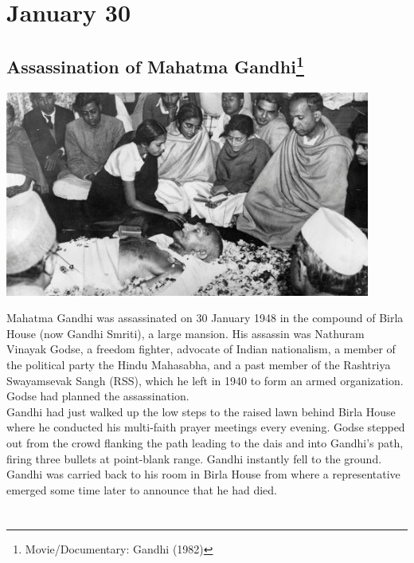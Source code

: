 \documentclass[11pt]{report}
\begin{document}
\section{January 30}
\subsection{Assassination of Mahatma Gandhi\protect\footnote{Movie/Documentary: Gandhi (1982)}}
\vspace{2mm}\begin{center}\includegraphics[width=12cm]{./img/gandhiDead.jpg}\end{center}
Mahatma Gandhi was assassinated on 30 January 1948 in the compound of Birla House (now Gandhi Smriti), a large mansion. His assassin was Nathuram Vinayak Godse, a freedom fighter, advocate of Indian nationalism, a member of the political party the Hindu Mahasabha, and a past member of the Rashtriya Swayamsevak Sangh (RSS), which he left in 1940 to form an armed organization. Godse had planned the assassination.\\
\indent Gandhi had just walked up the low steps to the raised lawn behind Birla House where he conducted his multi-faith prayer meetings every evening. Godse stepped out from the crowd flanking the path leading to the dais and into Gandhi's path, firing three bullets at point-blank range. Gandhi instantly fell to the ground. Gandhi was carried back to his room in Birla House from where a representative emerged some time later to announce that he had died.
\section{}
\end{document}
